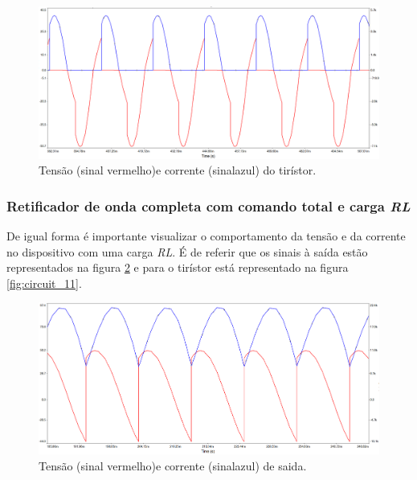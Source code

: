 \documentclass[a4paper,11pt]{article}
\numberwithin{equation}{section}
\begin{document}
\begin{figure}[h]
	\centering
	\includegraphics[keepaspectratio=true, scale=0.4]{img/circuito7}
	\caption{Tensão (sinal vermelho)e corrente (sinalazul) do tirístor.}
	\label{fig:circuit_9}
	\vspace{-0.8em}
\end{figure}

\vspace{12mm}

\subsubsection{Retificador de onda completa com comando total e carga \textit{RL}}

De igual forma é importante visualizar o comportamento da tensão e da corrente no dispositivo com uma carga \textit{RL}. É de referir que os sinais à saída estão representados na figura \ref{fig:circuit_10} e para o tirístor está representado na figura \ref{fig:circuit_11}.
\pagebreak

\begin{figure}[h]
	\centering
	\includegraphics[keepaspectratio=true, scale=0.4]{img/circuito8}
	\caption{Tensão (sinal vermelho)e corrente (sinalazul) de saida.}
	\label{fig:circuit_10}
	\vspace{-0.8em}
\end{figure}
\end{document}
